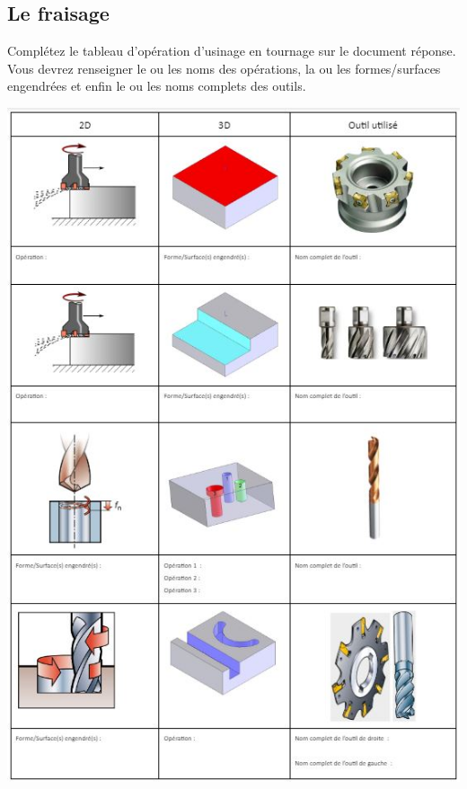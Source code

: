 \documentclass[12pt,a4paper]{article} %
\begin{document}
\subsection{Le fraisage}
\begin{exo} Complétez le tableau d'opération d'usinage en tournage sur le document réponse. Vous devrez renseigner le ou les noms des opérations, la ou les formes/surfaces engendrées et enfin le ou les noms complets des outils.  \end{exo}
\begin{center}
\includegraphics[scale=0.85]{FR1.JPG}
\end{center}

\newpage
\end{document}
